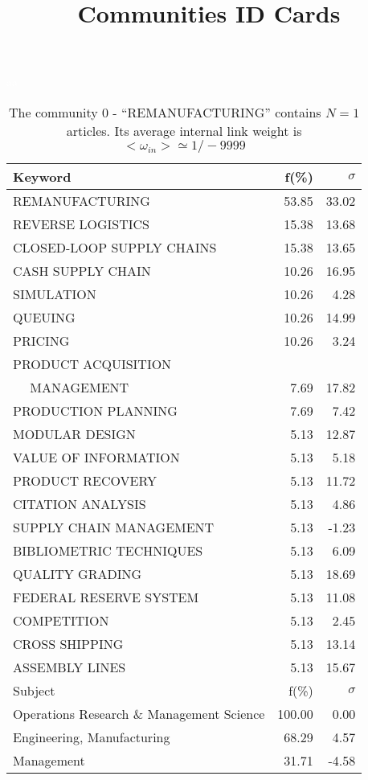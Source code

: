 \documentclass[a4paper,11pt]{report}
\title{{\bf Communities ID Cards}}
\date{\begin{flushleft}This document gather the ``ID Cards'' of the CC communities found within your database.\\
 The CC network was built by keeping a link between articles sharing at least 10 references. The communities characterized here correspond to the ones found in the level 0 (in the sense of the Louvain algo) which gathers more than 0 articles.\\
 These ID cards displays the most frequent keywords, subject categories, journals of publication, institution, countries, authors, references and reference journals of the articles of each community. The significance of an item $\sigma = \sqrt{N} (f - p) / \sqrt{p(1-p)}$ [where $N$ is the number of articles within the community and $f$ and $p$ are the proportion of articles respectively within the community and within the database displaying that item ] is also given (for example $\sigma > 5$ is really highly significant).\\
\vspace{1cm}
\copyright Sebastian Grauwin, Liu Weizhi - (2014) \end{flushleft}}
\begin{document}
\begin{landscape}
\maketitle
\clearpage

\begin{table}[!ht]
\caption{The community 0 - ``REMANUFACTURING'' contains $N = 1$ articles. Its average internal link weight is $<\omega_{in}> \simeq 1/-9999$ }
\textcolor{white}{aa}\\
{\scriptsize\begin{tabular}{|l r r|}
\hline
Keyword & f(\%) & $\sigma$\\
\hline
REMANUFACTURING & 53.85 & 33.02\\
REVERSE LOGISTICS & 15.38 & 13.68\\
CLOSED-LOOP SUPPLY CHAINS & 15.38 & 13.65\\
CASH SUPPLY CHAIN & 10.26 & 16.95\\
SIMULATION & 10.26 & 4.28\\
QUEUING & 10.26 & 14.99\\
PRICING & 10.26 & 3.24\\
PRODUCT ACQUISITION &  & \\
$\quad$ MANAGEMENT & 7.69 & 17.82\\
PRODUCTION PLANNING & 7.69 & 7.42\\
MODULAR DESIGN & 5.13 & 12.87\\
VALUE OF INFORMATION & 5.13 & 5.18\\
PRODUCT RECOVERY & 5.13 & 11.72\\
CITATION ANALYSIS & 5.13 & 4.86\\
SUPPLY CHAIN MANAGEMENT & 5.13 & -1.23\\
BIBLIOMETRIC TECHNIQUES & 5.13 & 6.09\\
QUALITY GRADING & 5.13 & 18.69\\
FEDERAL RESERVE SYSTEM & 5.13 & 11.08\\
COMPETITION & 5.13 & 2.45\\
CROSS SHIPPING & 5.13 & 13.14\\
ASSEMBLY LINES & 5.13 & 15.67\\
\hline
\hline
Subject & f(\%) & $\sigma$\\
\hline
Operations Research \& Management Science & 100.00 & 0.00\\
Engineering, Manufacturing & 68.29 & 4.57\\
Management & 31.71 & -4.58\\

\end{tabular}}
\end{table}
\end{landscape}
\end{document}
